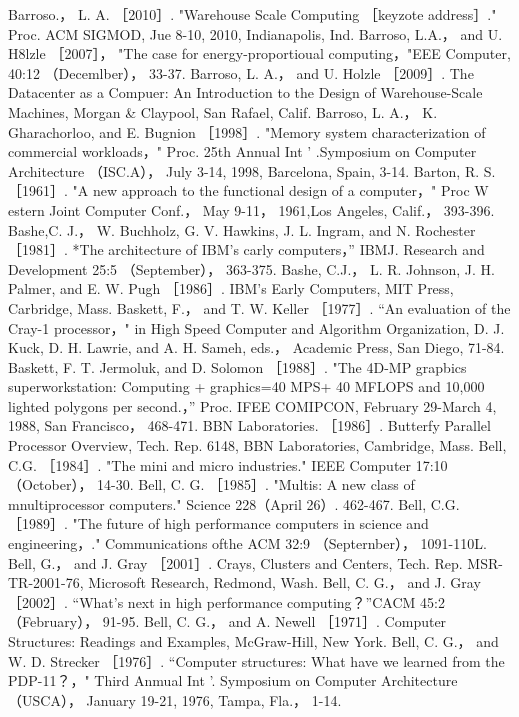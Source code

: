Barroso.， L. A. ［2010］. "Warehouse Scale Computing ［keyzote address］." Proc. ACM SIGMOD, Jue 8-10, 2010, Indianapolis, Ind.
Barroso, L.A.， and U. H8lzle ［2007］， "The case for energy-proportioual computing，"EEE Computer, 40:12 （Decemlber）， 33-37.
Barroso, L. A.， and U. Holzle ［2009］. The Datacenter as a Compuer: An Introduction to the Design of Warehouse-Scale
Machines, Morgan & Claypool, San Rafael, Calif.
Barroso, L. A.， K. Gharachorloo, and E. Bugnion ［1998］. "Memory system characterization of commercial workloads，" Proc.
25th Annual Int ' .Symposium on Computer Architecture （ISC.A）， July 3-14, 1998, Barcelona, Spain, 3-14.
Barton, R. S. ［1961］. "A new approach to the functional design of a computer，" Proc W estern Joint Computer Conf.， May 9-11，
1961,Los Angeles, Calif.， 393-396.
Bashe,C. J.， W. Buchholz, G. V. Hawkins, J. L. Ingram, and N. Rochester ［1981］. *The architecture of IBM's carly computers，”
IBMJ. Research and Development 25:5 （September）， 363-375.
Bashe, C.J.， L. R. Johnson, J. H. Palmer, and E. W. Pugh ［1986］. IBM's Early Computers, MIT Press, Carbridge, Mass.
Baskett, F.， and T. W. Keller ［1977］. “An evaluation of the Cray-1 processor，" in High Speed Computer and Algorithm
Organization, D. J. Kuck, D. H. Lawrie, and A. H. Sameh, eds.， Academic Press, San Diego, 71-84.
Baskett, F. T. Jermoluk, and D. Solomon ［1988］. "The 4D-MP grapbics superworkstation: Computing + graphics=40 MPS+ 40
MFLOPS and 10,000 lighted polygons per second.，” Proc. IFEE COMIPCON, February 29-March 4, 1988, San Francisco，
468-471.
BBN Laboratories. ［1986］. Butterfy Parallel Processor Overview, Tech. Rep. 6148, BBN Laboratories, Cambridge, Mass.
Bell, C.G. ［1984］. "The mini and micro industries." IEEE Computer 17:10 （October）， 14-30.
Bell, C. G. ［1985］. "Multis: A new class of mnultiprocessor computers." Science 228（April 26）. 462-467.
Bell, C.G. ［1989］. "The future of high performance computers in science and engineering，." Communications ofthe ACM 32:9
（Septernber）， 1091-110L.
Bell, G.， and J. Gray ［2001］. Crays, Clusters and Centers, Tech. Rep. MSR-TR-2001-76, Microsoft Research, Redmond, Wash.
Bell, C. G.， and J. Gray ［2002］. “What's next in high performance computing？”CACM 45:2 （February）， 91-95.
Bell, C. G.， and A. Newell ［1971］. Computer Structures: Readings and Examples, McGraw-Hill, New York.
Bell, C. G.， and W. D. Strecker ［1976］. “Computer structures: What have we learned from the PDP-11？，" Third Anmual Int '.
Symposium on Computer Architecture （USCA）， January 19-21, 1976, Tampa, Fla.， 1-14.
